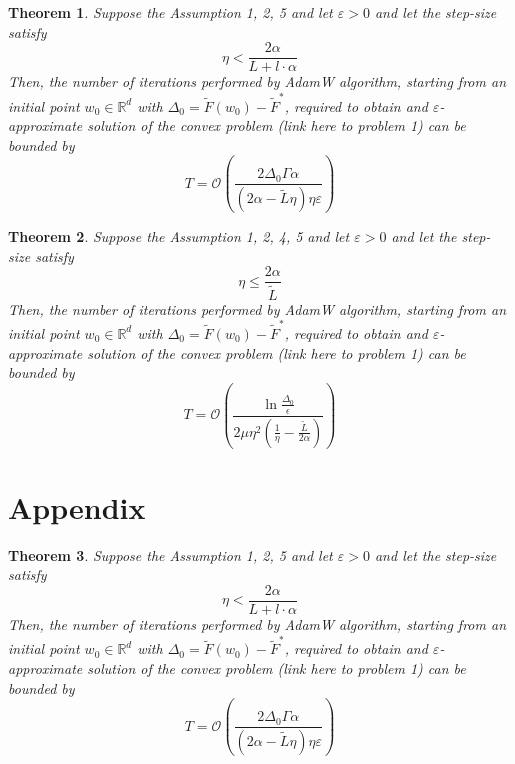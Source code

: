 \documentclass{article}
\newtheorem{theorem}{Theorem}
\begin{document}
\begin{theorem}

Suppose the Assumption 1, 2, 5 and let $\varepsilon > 0$ and let the step-size satisfy
\begin{equation*}
    \eta < \frac{2 \alpha}{L + l \cdot \alpha} 
\end{equation*}
Then, the number of iterations performed by AdamW algorithm, starting from an initial point $w_0 \in \mathbb{R}^d$ with $\Delta_0 = \tilde{F}(w_0) - \tilde{F}^*$, required to obtain and $\varepsilon$-approximate solution of the convex problem (link here to problem 1) can be bounded by
\begin{equation*}
      T = \mathcal{O}\left( \frac{2\Delta_0 \Gamma \alpha } {(2\alpha - \tilde{L}\eta) \eta \varepsilon} \right)
\end{equation*}

\end{theorem}

\begin{theorem}
    Suppose the Assumption 1, 2, 4, 5 and let $\varepsilon > 0$ and let the step-size satisfy
    \begin{equation*}
        \eta \leq \frac{2 \alpha}{\tilde{L}}
    \end{equation*}
    Then, the number of iterations performed by AdamW algorithm, starting from an initial point $w_0 \in \mathbb{R}^d$ with $\Delta_0 = \tilde{F}(w_0) - \tilde{F}^*$, required to obtain and $\varepsilon$-approximate solution of the convex problem (link here to problem 1) can be bounded by
    \begin{equation*}
        T =  \mathcal{O}\left( \frac{\ln \frac{\Delta_0}{\epsilon}}{2 \mu \eta^2(\frac{1}{\eta} - \frac{\tilde{L}}{2 \alpha})} \right)
    \end{equation*}
\end{theorem}
\section{Appendix}

\begin{theorem}
Suppose the Assumption 1, 2, 5 and let $\varepsilon > 0$ and let the step-size satisfy
\begin{equation*}
    \eta < \frac{2 \alpha}{L + l \cdot \alpha} 
\end{equation*}
Then, the number of iterations performed by AdamW algorithm, starting from an initial point $w_0 \in \mathbb{R}^d$ with $\Delta_0 = \tilde{F}(w_0) - \tilde{F}^*$, required to obtain and $\varepsilon$-approximate solution of the convex problem (link here to problem 1) can be bounded by
\begin{equation*}
      T = \mathcal{O}\left( \frac{2\Delta_0 \Gamma \alpha } {(2\alpha - \tilde{L}\eta) \eta \varepsilon} \right)
\end{equation*}

\end{theorem}
\end{document}
